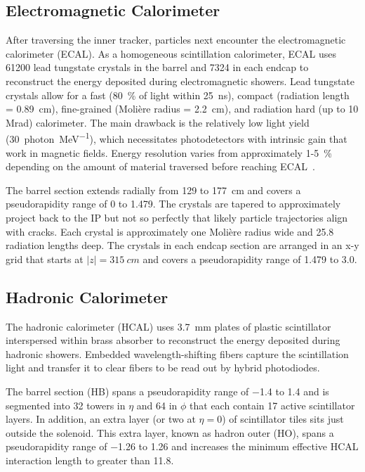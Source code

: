 \documentclass[12pt]{article}
\begin{document}
    \subsection{Electromagnetic Calorimeter}
        After traversing the inner tracker, particles next encounter the electromagnetic calorimeter (ECAL). As a homogeneous scintillation calorimeter, ECAL uses \num{61200} lead tungstate crystals in the barrel and \num{7324} in each endcap to reconstruct the energy deposited during electromagnetic showers. Lead tungstate crystals allow for a fast (\SI{80}{\percent} of light within \SI{25}{\nano\s}), compact (radiation length = \SI{0.89}{cm}), fine-grained (Moli\`ere radius = \SI{2.2}{cm}), and radiation hard (up to 10 Mrad) calorimeter. The main drawback is the relatively low light yield (\SI{30}{photon\per\mega\electronvolt}), which necessitates photodetectors with intrinsic gain that work in magnetic fields\cite{cms_experiment, cms_tdr}. Energy resolution varies from approximately \num{1}-\SI{5}{\percent} depending on the amount of material traversed before reaching ECAL~\cite{ecal_performance}.

        The barrel section extends radially from \num{129} to \SI{177}{cm} and covers a pseudorapidity range of \num{0} to \num{1.479}. The crystals are tapered to approximately project back to the IP but not so perfectly that likely particle trajectories align with cracks. Each crystal is approximately one Moli\`ere radius wide and 25.8 radiation lengths deep. The crystals in each endcap section are arranged in an x-y grid that starts at $\lvert z \rvert = \SI{315}{cm}$ and covers a pseudorapidity range of \num{1.479} to \num{3.0}.

    \subsection{Hadronic Calorimeter}
        The hadronic calorimeter (HCAL) uses \SI{3.7}{mm} plates of plastic scintillator interspersed within brass absorber to reconstruct the energy deposited during hadronic showers. Embedded wavelength-shifting fibers capture the scintillation light and transfer it to clear fibers to be read out by hybrid photodiodes\cite{cms_experiment, cms_tdr}.

        The barrel section (HB) spans a pseudorapidity range of \num{-1.4} to \num{1.4} and is segmented into \num{32} towers in $\eta$ and \num{64} in $\phi$ that each contain 17 active scintillator layers. In addition, an extra layer (or two at $\eta = \num{0}$) of scintillator tiles sits just outside the solenoid. This extra layer, known as hadron outer (HO), spans a pseudorapidity range of \num{-1.26} to \num{1.26} and increases the minimum effective HCAL interaction length to greater than \num{11.8}.
\end{document}
